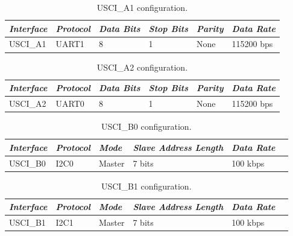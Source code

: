 \begin{table}[!h]
    \centering
    \begin{tabular}{llllll}
        \toprule[1.5pt]
        \textit{Interface} & \textit{Protocol} & \textit{Data Bits} & \textit{Stop Bits} & \textit{Parity} & \textit{Data Rate} \\
        \midrule
        USCI\_A1           & UART1             & 8                  & 1                  & None            & 115200 bps  \\
        \bottomrule[1.5pt]
    \end{tabular}
    \caption{USCI\_A1 configuration.}
    \label{tab:usci-a1-config}
\end{table}

\begin{table}[!h]
    \centering
    \begin{tabular}{llllll}
        \toprule[1.5pt]
        \textit{Interface} & \textit{Protocol} & \textit{Data Bits} & \textit{Stop Bits} & \textit{Parity} & \textit{Data Rate} \\
        \midrule
        USCI\_A2           & UART0             & 8                  & 1                  & None            & 115200 bps  \\
        \bottomrule[1.5pt]
    \end{tabular}
    \caption{USCI\_A2 configuration.}
    \label{tab:usci-a2-config}
\end{table}

\begin{table}[!h]
    \centering
    \begin{tabular}{llllll}
        \toprule[1.5pt]
        \textit{Interface} & \textit{Protocol} & \textit{Mode}  & \textit{Slave Address Length} & \textit{Data Rate} \\
        \midrule
        USCI\_B0           & I2C0              & Master         & 7 bits                        & 100 kbps  \\
        \bottomrule[1.5pt]
    \end{tabular}
    \caption{USCI\_B0 configuration.}
    \label{tab:usci-b0-config}
\end{table}

\begin{table}[!h]
    \centering
    \begin{tabular}{llllll}
        \toprule[1.5pt]
        \textit{Interface} & \textit{Protocol} & \textit{Mode}  & \textit{Slave Address Length} & \textit{Data Rate} \\
        \midrule
        USCI\_B1           & I2C1              & Master         & 7 bits                        & 100 kbps  \\
        \bottomrule[1.5pt]
    \end{tabular}
    \caption{USCI\_B1 configuration.}
    \label{tab:usci-b1-config}
\end{table}

